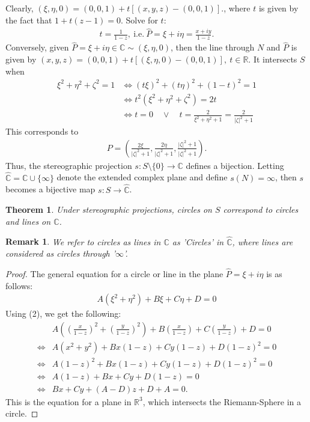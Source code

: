 \documentclass[12pt, a4paper]{article}
\theoremstyle{plain}
\newtheorem{thm}{Theorem} %
\newtheorem{rem}{Remark}
\theoremstyle{definition}
\begin{document}
			Clearly, $(\xi,\eta,0) = (0,0,1)+ t[(x,y,z)-(0,0,1)]$., where $t$ is given by the fact that $1+t(z-1) = 0$. Solve for $t$:
			\begin{align*}
				t = \frac{1}{1-z}, \mathrm{\:i.e.\:} \hat{P} = \xi + i\eta = \frac{x+iy}{1-z}.\tag*{(2)}
			\end{align*}
			Conversely, given $\hat{P}=\xi+i\eta\in \mathbb{C}\sim(\xi,\eta,0)$, then the line through $N$ and $\hat{P}$ is given by $(x,y,z)=(0,0,1)+t[(\xi,\eta,0)-(0,0,1)],\:t\in \mathbb{R}$. It intersects $S$ when
			\begin{align*}
				\xi^2+\eta^2+\zeta^2=1 &\iff (t\xi)^2+(t\eta)^2+(1-t)^2 = 1\\
				&\iff t^2(\xi^2+\eta^2+\zeta^2) = 2t\\
				&\iff t=0\quad \vee\quad t = \frac{2}{\xi^2+\eta^2+1} = \frac{2}{|\zeta|^2+1}
			\end{align*}
			This corresponds to
			\begin{align*}
				P = \left(\frac{2\xi}{|\zeta|^2+1},\frac{2\eta}{|\zeta|^2+1},\frac{|\zeta|^2+1}{|\zeta|^2+1}\right).
			\end{align*}
			Thus, the stereographic projection $s:S\setminus\{0\}\to \mathbb{C}$ defines a bijection. Letting $\hat{\mathbb{C}}=\mathbb{C}\cup\{\infty\}$ denote the extended complex plane and define $s(N) = \infty$, then $s$ becomes a bijective map $s:S\to\hat{\mathbb{C}}$.\\

			\begin{thm}
				Under stereographic projections, circles on $S$ correspond to circles and lines on $\mathbb{C}$.\\
			\end{thm}

			\begin{rem}
				We refer to circles as lines in $\mathbb{C}$ as 'Circles' in $\hat{\mathbb{C}}$, where lines are considered as circles through '$\infty$'.
			\end{rem}

			\begin{proof}
				The general equation for a circle or line in the plane $\hat{P} = \xi + i \eta$ is as follows:
				\begin{align*}
					A(\xi^2+\eta^2) + B \xi + C \eta + D = 0
				\end{align*}
				Using (2), we get the following:
				\begin{align*}
					&A\left(\left(\frac{x}{1-z}\right)^2+\left(\frac{y}{1-z}\right)^2\right) + 
					B\left(\frac{x}{1-z}\right) + C \left(\frac{y}{1-z}\right) + D = 0 \\ \iff
					&A(x^2+y^2) + Bx(1-z) + Cy(1-z) + D(1-z)^2 = 0 \\ \iff
					&A(1-z)^2 + Bx(1-z) + Cy(1-z) + D(1-z)^2 = 0\\ \iff
					&A(1-z) + Bx + Cy + D(1-z) = 0\\ \iff
					&Bx + Cy + (A-D)z + D+A = 0.
				\end{align*}
				This is the equation for a plane in $\mathbb{R}^3$, which intersects the Riemann-Sphere in a circle.
			\end{proof}
\end{document}
